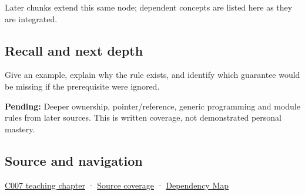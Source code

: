 Later chunks extend this same node; dependent concepts are listed here as they are integrated.

\subsection{Recall and next depth}\label{appendix-806686359e1b-recall-and-next-depth}

Give an example, explain why the rule exists, and identify which guarantee would be missing if the prerequisite were ignored.

\textbf{Pending:} Deeper ownership, pointer/reference, generic programming and module rules from later sources. This is written coverage, not demonstrated personal mastery.

\subsection{Source and navigation}\label{appendix-806686359e1b-source-and-navigation}

\hyperref[01-foundations-i-ch002-giving-a-program-a-buildable-shape]{C007 teaching chapter} · \hyperref[appendix-fd090d982a15-m007---parts-101-112]{Source coverage} · \hyperref[appendix-4ad47bdd269a]{Dependency Map}
